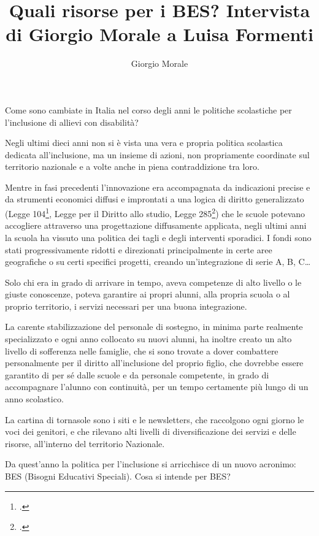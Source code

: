 \author{Giorgio Morale}
\title{Quali risorse per i BES?\xheadbreak
Intervista di Giorgio Morale a Luisa Formenti}
\label{cha:morale141013}
\maketitle

Come sono cambiate in Italia nel corso degli anni le politiche scolastiche per l'inclusione di allievi con disabilità?

Negli ultimi dieci anni non si è vista una vera e propria politica scolastica dedicata all'inclusione, ma un insieme di azioni, non propriamente coordinate sul territorio nazionale e a volte anche in piena contraddizione tra loro.

Mentre in fasi precedenti l'innovazione era accompagnata da indicazioni precise e da strumenti economici diffusi e improntati a una logica di diritto generalizzato (Legge 104\footcite{Legge_104_92}, Legge per il Diritto allo studio, Legge 285\footcite{Legge_285_1997}) che le scuole potevano accogliere attraverso una progettazione diffusamente applicata, negli ultimi anni la scuola ha vissuto una politica dei tagli e degli interventi sporadici. I fondi sono stati progressivamente ridotti e direzionati principalmente in certe aree geografiche o su certi specifici progetti, creando un'integrazione di serie A, B, C…

Solo chi era in grado di arrivare in tempo, aveva competenze di alto livello o le giuste conoscenze, poteva garantire ai propri alunni, alla propria scuola o al proprio territorio, i servizi necessari per una buona integrazione.

La carente stabilizzazione del personale di sostegno, in minima parte realmente specializzato e ogni anno collocato su nuovi alunni, ha inoltre creato un alto livello di sofferenza nelle famiglie, che si sono trovate a dover combattere personalmente per il diritto all'inclusione del proprio figlio, che dovrebbe essere garantito di per sé dalle scuole e da personale competente, in grado di accompagnare l'alunno con continuità, per un tempo certamente più lungo di un anno scolastico.

La cartina di tornasole sono i siti e le newsletters, che raccolgono ogni giorno le voci dei genitori, e che rilevano alti livelli di diversificazione dei servizi e delle risorse, all'interno del territorio Nazionale.

Da quest'anno la politica per l'inclusione si arricchisce di un nuovo acronimo: BES (Bisogni Educativi Speciali). Cosa si intende per BES?


